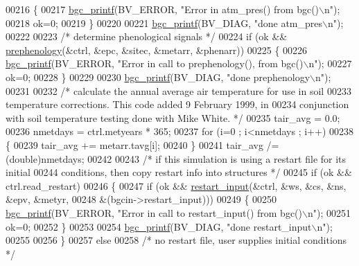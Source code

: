 \begin{DoxyCode}
00216     \{
00217         \hyperlink{bgc__io_8c_af287cce6e2aede1ce337de9319e80d0d}{bgc\_printf}(BV\_ERROR, \textcolor{stringliteral}{"Error in atm\_pres() from bgc()\(\backslash\)n"});
00218         ok=0;
00219     \}
00220     
00221     \hyperlink{bgc__io_8c_af287cce6e2aede1ce337de9319e80d0d}{bgc\_printf}(BV\_DIAG, \textcolor{stringliteral}{"done atm\_pres\(\backslash\)n"});
00222     
00223     \textcolor{comment}{/* determine phenological signals */}
00224     \textcolor{keywordflow}{if} (ok && \hyperlink{prephenology_8c_a268168ddb0923733bcc36138cda1b94b}{prephenology}(&ctrl, &epc, &sitec, &metarr, &phenarr))
00225     \{
00226         \hyperlink{bgc__io_8c_af287cce6e2aede1ce337de9319e80d0d}{bgc\_printf}(BV\_ERROR, \textcolor{stringliteral}{"Error in call to prephenology(), from bgc()\(\backslash\)n"});
00227         ok=0;
00228     \}
00229     
00230     \hyperlink{bgc__io_8c_af287cce6e2aede1ce337de9319e80d0d}{bgc\_printf}(BV\_DIAG, \textcolor{stringliteral}{"done prephenology\(\backslash\)n"});
00231     
00232     \textcolor{comment}{/* calculate the annual average air temperature for use in soil }
00233 \textcolor{comment}{    temperature corrections. This code added 9 February 1999, in}
00234 \textcolor{comment}{    conjunction with soil temperature testing done with Mike White. */}
00235     tair\_avg = 0.0;
00236     nmetdays = ctrl.metyears * 365;
00237     \textcolor{keywordflow}{for} (i=0 ; i<nmetdays ; i++)
00238     \{
00239         tair\_avg += metarr.tavg[i];
00240     \}
00241     tair\_avg /= (double)nmetdays;
00242     
00243     \textcolor{comment}{/* if this simulation is using a restart file for its initial}
00244 \textcolor{comment}{    conditions, then copy restart info into structures */}
00245     \textcolor{keywordflow}{if} (ok && ctrl.read\_restart)
00246     \{
00247         \textcolor{keywordflow}{if} (ok && \hyperlink{restart__io_8c_abbb2b2cf473fe2e7b5c1ac5f0790734d}{restart\_input}(&ctrl, &ws, &cs, &ns, &epv, &metyr,
00248             &(bgcin->restart\_input)))
00249         \{
00250             \hyperlink{bgc__io_8c_af287cce6e2aede1ce337de9319e80d0d}{bgc\_printf}(BV\_ERROR, \textcolor{stringliteral}{"Error in call to restart\_input() from bgc()\(\backslash\)n"});
00251             ok=0;
00252         \}
00253         
00254         \hyperlink{bgc__io_8c_af287cce6e2aede1ce337de9319e80d0d}{bgc\_printf}(BV\_DIAG, \textcolor{stringliteral}{"done restart\_input\(\backslash\)n"});
00255     
00256     \}
00257     \textcolor{keywordflow}{else}
00258     \textcolor{comment}{/* no restart file, user supplies initial conditions */}

\end{DoxyCode}
